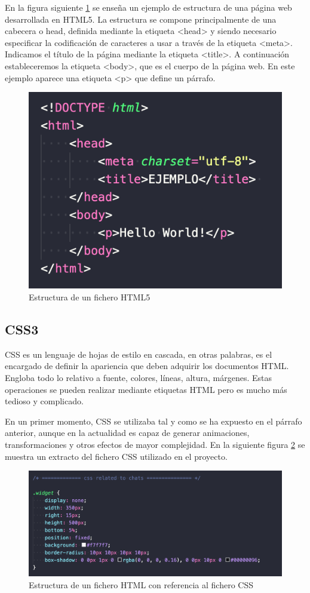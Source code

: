 En la figura siguiente \ref{fig:html5} se enseña un ejemplo de estructura de una página web desarrollada en HTML5. La estructura se compone principalmente de una cabecera o head, definida mediante la etiqueta <head> y siendo necesario especificar la codificación de caracteres a usar a través de la etiqueta <meta>. Indicamos el título de la página mediante la etiqueta <title>. A continuación estableceremos la etiqueta <body>, que es el cuerpo de la página web. En este ejemplo aparece una etiqueta <p> que define un párrafo.

\begin{figure}[H]
    \centering
    \includegraphics[scale=0.7]{include/capturas/Html5.png}
    \caption{Estructura de un fichero HTML5}
    \label{fig:html5}
\end{figure}

\subsection{CSS3}

CSS es un lenguaje de hojas de estilo en cascada, en otras palabras, es el encargado de definir la apariencia que deben adquirir los documentos HTML. Engloba todo lo relativo a fuente, colores, líneas, altura, márgenes. Estas operaciones se pueden realizar mediante etiquetas HTML pero es mucho más tedioso y complicado. 

En un primer momento, CSS se utilizaba tal y como se ha expuesto en el párrafo anterior, aunque en la actualidad es capaz de generar animaciones, transformaciones y otros efectos de mayor complejidad. En la siguiente figura \ref{fig:css} se muestra un extracto del fichero CSS utilizado en el proyecto.

\begin{figure}[H]
    \centering
    \includegraphics[scale=0.7]{include/capturas/Css.png}
    \caption{Estructura de un fichero HTML con referencia al fichero CSS}
    \label{fig:css}
\end{figure}
